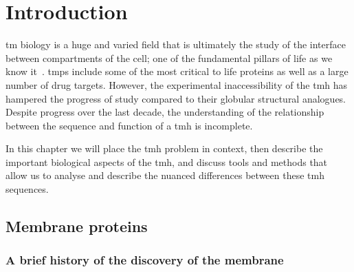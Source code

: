 \chapter{Introduction}
\sloppy
\gls{tm} biology is a huge and varied field that is ultimately the study of the interface between compartments of the cell; one of the fundamental pillars of life as we know it~\cite{Ladokhin2015}.
\gls{tmp}s include some of the most critical to life proteins as well as a large number of drug targets.
However, the experimental inaccessibility of the \gls{tmh} has hampered the progress of study compared to their globular structural analogues.
Despite progress over the last decade, the understanding of the relationship between the sequence and function of a \gls{tmh} is incomplete.

In this chapter we will place the \gls{tmh} problem in context, then describe the important biological aspects of the \gls{tmh}, and discuss tools and methods that allow us to analyse and describe the nuanced differences between these \gls{tmh} sequences.

\section{Membrane proteins}

\subsection{A brief history of the discovery of the membrane}


